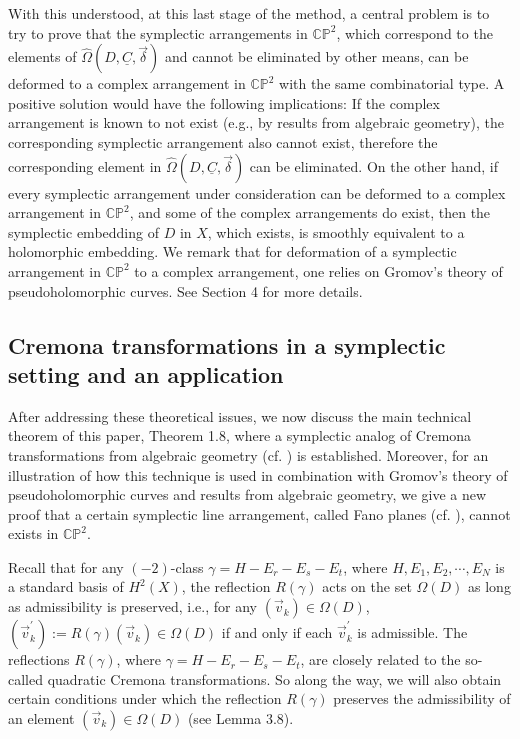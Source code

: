\documentclass[11pt]{amsart}
\theoremstyle{plain}
\numberwithin{theorem}{section}
\theoremstyle{definition}
\newcommand{\C}{{\mathbb C}}
\renewcommand{\P}{{\mathbb P}}
\begin{document}
With this understood, at this last stage of the method, a central problem is to try to prove that the symplectic arrangements in $\C\P^2$, which correspond to the elements of $\hat{\Omega}(D,\underline{C},\vec{\delta})$ and cannot be eliminated by other means, can be deformed to a complex arrangement in $\C\P^2$
with the same combinatorial type.  A positive solution would have the following implications: If the complex
arrangement is known to not exist (e.g., by results from algebraic geometry), the corresponding symplectic arrangement also cannot exist, therefore the corresponding element in $\hat{\Omega}(D,\underline{C},\vec{\delta})$ can be eliminated. On the other hand, if every symplectic arrangement under consideration can be deformed to a complex arrangement in $\C\P^2$, and some of the complex arrangements do exist, then the symplectic embedding of $D$ in $X$, which exists, is smoothly equivalent to a holomorphic embedding. We remark that for deformation of a symplectic arrangement in $\C\P^2$ to a complex arrangement, one relies on Gromov's theory of pseudoholomorphic curves. See Section 4 for more details. 

\vspace{2mm}

\subsection{Cremona transformations in a symplectic setting and an application} 
After addressing these theoretical issues, we now discuss the main technical theorem of this paper, Theorem 1.8, where a symplectic analog of Cremona transformations from algebraic geometry (cf. \cite{AC}) is 
established. Moreover, for an illustration of how this technique is used in combination with Gromov's theory
of pseudoholomorphic curves and results from algebraic geometry, we give a new proof that a certain symplectic line arrangement, called Fano planes (cf. \cite{RuS}), cannot exists in $\C\P^2$. 

Recall that for any $(-2)$-class $\gamma=H-E_r-E_s-E_t$, where $H,E_1,E_2,\cdots, E_N$ is a standard basis of $H^2(X)$, the reflection $R(\gamma)$ acts on the set $\Omega(D)$ as long as admissibility is preserved, i.e., for any $(\vec{v}_k)\in \Omega(D)$, $(\vec{v}_k^\prime):=R(\gamma)(\vec{v}_k)\in \Omega(D)$ if and only if each $\vec{v}_k^\prime$ is admissible. The reflections $R(\gamma)$, where $\gamma=H-E_r-E_s-E_t$, are closely related to the so-called quadratic Cremona transformations. So along the way, we will also obtain certain conditions under which the reflection $R(\gamma)$ preserves the admissibility of an element $(\vec{v}_k)\in \Omega(D)$ (see Lemma 3.8).
\end{document}
